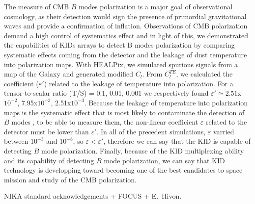 \documentclass[twocolumn, traditabstract]{aa}
\begin{document}
The measure of CMB $B$ modes polarization is a major goal of observational cosmology, as their detection would sign the presence of primordial gravitational waves and provide a confirmation of inflation. Observations of CMB polarization demand a high control of systematics effect and in light of this, we demonstrated the capabilities of KIDs arrays to detect B modes polarization by comparing systematic effects coming from the detector and the leakage of dust temperature into polarization maps. With HEALPix, we simulated spurious signals from a map of the Galaxy and generated modified $C_{l}$. From $C_{l}^{TE}$, we calculated the coefficient ($\varepsilon'$) related to the leakage of temperature into polarization. For a tensor-to-scalar ratio (T/S) = 0.1, 0.01, 0.001 we respectively found $\varepsilon' \simeq 2.51$x$10^{-2}$, 7.95x$10^{-3}$, 2.51x$10^{-3}$. Because the leakage of temperature into polarization maps is the systematic effect that is most likely to contaminate the detection of $B$ modes , to be able to measure them, the non-linear coefficient $\varepsilon$ related to the detector must be lower than $\varepsilon'$. In all of the precedent simulations, $\varepsilon $ varried between $10^{-3}$ and $10^{-8}$, so $\varepsilon < \varepsilon'$, therefore we can say that the KID is capable of detecting $B$ mode polarization. Finally, because of the KID multiplexing ability and its capability of detecting $B$ mode polarization, we can say that KID technology is developping toward becoming one of the best candidates to space mission and study of the CMB polarization.
 


\begin{acknowledgements}
NIKA standard acknowledgements + FOCUS + E.~Hivon.
\end{acknowledgements}
\end{document}
